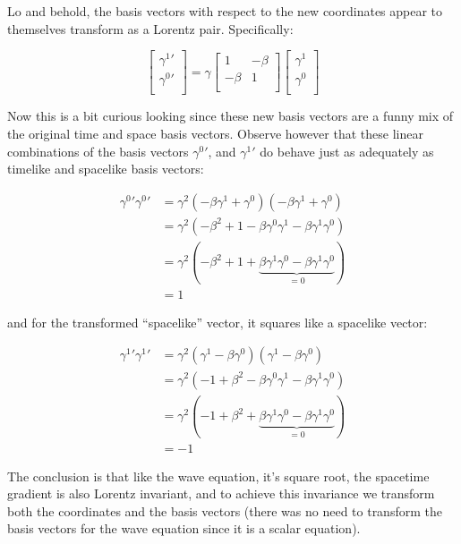 Lo and behold, the basis vectors with respect to the new coordinates appear to themselves transform as a Lorentz pair.  Specifically:

\begin{equation*}
\begin{bmatrix}
{\gamma^1}' \\
{\gamma^0}' \\
\end{bmatrix}
=
\gamma
\begin{bmatrix}
1 & -\beta \\
-\beta & 1 \\
\end{bmatrix}
\begin{bmatrix}
{\gamma^1} \\
{\gamma^0} \\
\end{bmatrix}
\end{equation*}

Now this is a bit curious looking since these new basis vectors are a funny mix of the original time and space basis vectors.  Observe however that these linear combinations of the basis vectors ${\gamma^0}'$, and ${\gamma^1}'$ do behave just as adequately as timelike and spacelike basis vectors:

\begin{align*}
{\gamma^0}' {\gamma^0}' 
&= \gamma^2 (-\beta \gamma^1 + \gamma^0 ) (-\beta \gamma^1 + \gamma^0 ) \\
&= \gamma^2 (-\beta^2 + 1 -\beta \gamma^0\gamma^1 -\beta \gamma^1 \gamma^0 ) \\
&= \gamma^2 (-\beta^2 + 1 + \underbrace{\beta \gamma^1\gamma^0 -\beta \gamma^1 \gamma^0}_{=0} ) \\
&= 1 
\end{align*}

and for the transformed ``spacelike'' vector, it squares like a spacelike vector:

\begin{align*}
{\gamma^1}' {\gamma^1}' 
&= \gamma^2 (\gamma^1 -\beta \gamma^0) (\gamma^1 -\beta \gamma^0) \\
&= \gamma^2 (-1 + \beta^2 -\beta\gamma^0 \gamma^1 -\beta\gamma^1\gamma^0) \\
&= \gamma^2 (-1 + \beta^2 + \underbrace{\beta \gamma^1\gamma^0 -\beta \gamma^1 \gamma^0}_{=0} ) \\
&= -1 
\end{align*}

The conclusion is that like the wave equation, it's square root, the spacetime gradient is also Lorentz invariant, and to achieve this invariance we
transform both the coordinates and the basis vectors (there was no need to transform the basis vectors for the wave equation since it is a scalar
equation).

